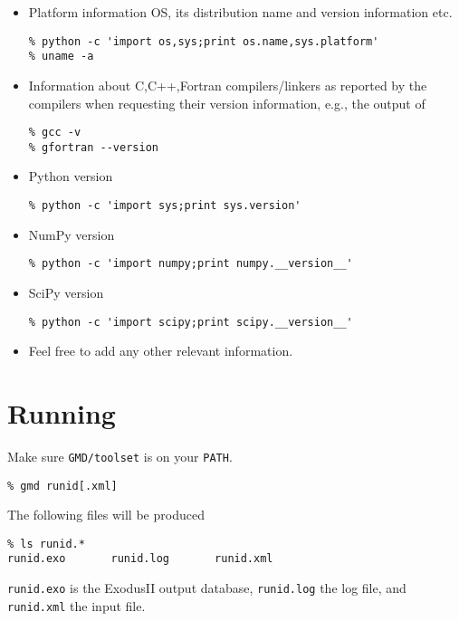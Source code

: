 \documentclass[11pt]{report}
\begin{document}
\begin{itemize}
  \item Platform information OS, its distribution name and version information
  etc.
\begin{verbatim}
% python -c 'import os,sys;print os.name,sys.platform'
% uname -a
\end{verbatim}

  \item Information about C,C++,Fortran compilers/linkers as reported by the
  compilers when requesting their version information, e.g., the output of
\begin{verbatim}
% gcc -v
% gfortran --version
\end{verbatim}

  \item Python version
\begin{verbatim}
% python -c 'import sys;print sys.version'
\end{verbatim}

\item NumPy version
\begin{verbatim}
% python -c 'import numpy;print numpy.__version__'
\end{verbatim}

\item SciPy version
\begin{verbatim}
% python -c 'import scipy;print scipy.__version__'
\end{verbatim}

\item Feel free to add any other relevant information.
\end{itemize}

\chapter{Running}
Make sure \texttt{GMD/toolset} is on your \texttt{PATH}.
\begin{verbatim}
% gmd runid[.xml]
\end{verbatim}

The following files will be produced
\begin{verbatim}
% ls runid.*
runid.exo       runid.log       runid.xml
\end{verbatim}
%
\texttt{runid.exo} is the ExodusII output database, \texttt{runid.log} the log
file, and \texttt{runid.xml} the input file.
\end{document}
